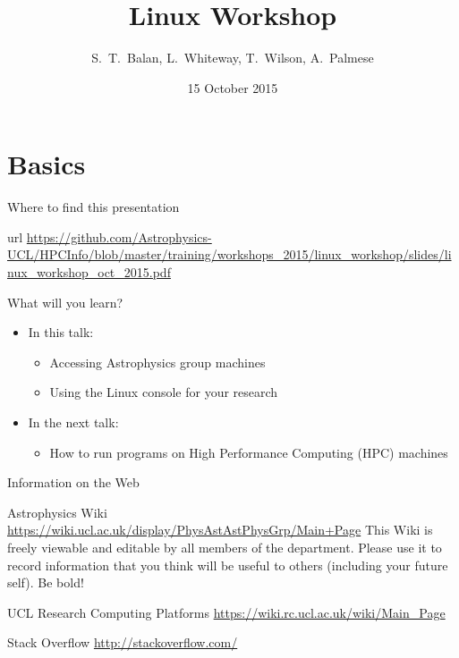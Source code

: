 \documentclass{beamer}
\title[Linux  Workshop] %
{Linux  Workshop}
\author[Balan, Whiteway, Wilson, Palmese] %
{S.~T.~Balan, L.~Whiteway, T.~Wilson, A.~Palmese }
\institute[UCL]
{
  Department of Physics and Astronomy\\
  University College London
}
\date[Linux  2015]
{15 October 2015}
\begin{document}
\frame{\titlepage}

\section{Basics}

\begin{frame}{Where to find this presentation}
  \begin{block}{url}
    \url{https://github.com/Astrophysics-UCL/HPCInfo/blob/master/training/workshops_2015/linux_workshop/slides/linux_workshop_oct_2015.pdf}
  \end{block}
\end{frame}


\begin{frame}{What will you learn?}
  \begin{itemize}
    \item{In this talk:}
    \begin{itemize}
      \item Accessing Astrophysics group machines
      \item Using the Linux console for your research
    \end{itemize}
    \item{In the next talk:}
    \begin{itemize}
      \item How to run programs on High Performance Computing (HPC) machines
    \end{itemize}
  \end{itemize}
\end{frame}

\begin{frame}{Information on the Web}
  \begin{block}{Astrophysics Wiki}
    \url{https://wiki.ucl.ac.uk/display/PhysAstAstPhysGrp/Main+Page}
    This Wiki is freely viewable and editable by all members of the department. Please use it to record information that you think will be useful to others (including your future self). Be bold!
  \end{block}

  \begin{block}{UCL Research Computing Platforms}
    \url{https://wiki.rc.ucl.ac.uk/wiki/Main_Page}
  \end{block}
  
  \begin{block}{Stack Overflow}
    \url{http://stackoverflow.com/}
  \end{block}
  
\end{frame}
\end{document}

